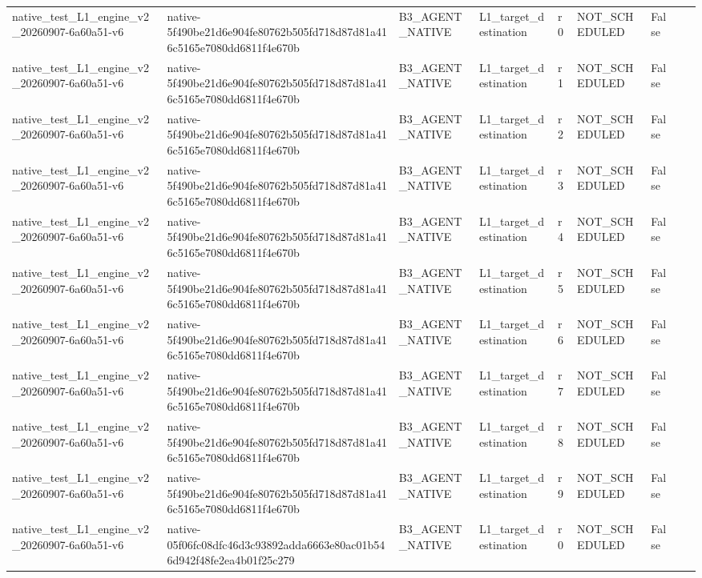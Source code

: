 \begin{tabular}{lllllllll}
native\_test\_L1\_engine\_v2\_20260907-6a60a51-v6 & native-5f490be21d6e904fe80762b505fd718d87d81a416c5165e7080dd6811f4e670b & B3\_AGENT\_NATIVE & L1\_target\_destination & r0 & NOT\_SCHEDULED & False &  &  \\
native\_test\_L1\_engine\_v2\_20260907-6a60a51-v6 & native-5f490be21d6e904fe80762b505fd718d87d81a416c5165e7080dd6811f4e670b & B3\_AGENT\_NATIVE & L1\_target\_destination & r1 & NOT\_SCHEDULED & False &  &  \\
native\_test\_L1\_engine\_v2\_20260907-6a60a51-v6 & native-5f490be21d6e904fe80762b505fd718d87d81a416c5165e7080dd6811f4e670b & B3\_AGENT\_NATIVE & L1\_target\_destination & r2 & NOT\_SCHEDULED & False &  &  \\
native\_test\_L1\_engine\_v2\_20260907-6a60a51-v6 & native-5f490be21d6e904fe80762b505fd718d87d81a416c5165e7080dd6811f4e670b & B3\_AGENT\_NATIVE & L1\_target\_destination & r3 & NOT\_SCHEDULED & False &  &  \\
native\_test\_L1\_engine\_v2\_20260907-6a60a51-v6 & native-5f490be21d6e904fe80762b505fd718d87d81a416c5165e7080dd6811f4e670b & B3\_AGENT\_NATIVE & L1\_target\_destination & r4 & NOT\_SCHEDULED & False &  &  \\
native\_test\_L1\_engine\_v2\_20260907-6a60a51-v6 & native-5f490be21d6e904fe80762b505fd718d87d81a416c5165e7080dd6811f4e670b & B3\_AGENT\_NATIVE & L1\_target\_destination & r5 & NOT\_SCHEDULED & False &  &  \\
native\_test\_L1\_engine\_v2\_20260907-6a60a51-v6 & native-5f490be21d6e904fe80762b505fd718d87d81a416c5165e7080dd6811f4e670b & B3\_AGENT\_NATIVE & L1\_target\_destination & r6 & NOT\_SCHEDULED & False &  &  \\
native\_test\_L1\_engine\_v2\_20260907-6a60a51-v6 & native-5f490be21d6e904fe80762b505fd718d87d81a416c5165e7080dd6811f4e670b & B3\_AGENT\_NATIVE & L1\_target\_destination & r7 & NOT\_SCHEDULED & False &  &  \\
native\_test\_L1\_engine\_v2\_20260907-6a60a51-v6 & native-5f490be21d6e904fe80762b505fd718d87d81a416c5165e7080dd6811f4e670b & B3\_AGENT\_NATIVE & L1\_target\_destination & r8 & NOT\_SCHEDULED & False &  &  \\
native\_test\_L1\_engine\_v2\_20260907-6a60a51-v6 & native-5f490be21d6e904fe80762b505fd718d87d81a416c5165e7080dd6811f4e670b & B3\_AGENT\_NATIVE & L1\_target\_destination & r9 & NOT\_SCHEDULED & False &  &  \\
native\_test\_L1\_engine\_v2\_20260907-6a60a51-v6 & native-05f06fc08dfc46d3c93892adda6663e80ac01b546d942f48fe2ea4b01f25c279 & B3\_AGENT\_NATIVE & L1\_target\_destination & r0 & NOT\_SCHEDULED & False &  &  \\

\end{tabular}
